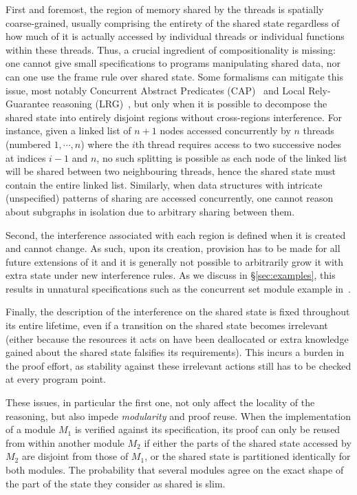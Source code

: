 First and foremost, the region of memory shared by the threads is
spatially coarse-grained, usually comprising the entirety of the
shared state regardless of how much of it is actually accessed by
individual threads or individual functions within these threads. Thus,
a crucial ingredient of compositionality is missing: one cannot give
small specifications to programs manipulating shared data, nor can one
use the frame rule over shared state. Some formalisms can mitigate
this issue, most notably Concurrent Abstract Predicates
(CAP)~\cite{cap-ecoop10} and Local Rely-Guarantee reasoning
(LRG)~\cite{lrg}, but only when it is possible to decompose the shared
state into entirely disjoint regions without cross-regions
interference. For instance, given a linked list of $n+1$ nodes
accessed concurrently by $n$ threads (numbered $1, \cdots, n$) where
the $i$th thread requires access to two successive nodes at indices
$i-1$ and $n$, no such splitting is possible as each node of the
linked list will be shared between two neighbouring threads, hence the
shared state must contain the entire linked list. Similarly, when data
structures with intricate (unspecified) patterns of sharing are
accessed concurrently, one cannot reason about subgraphs in isolation
due to arbitrary sharing between them.

Second, the interference associated with each region is defined when it is created and cannot change. As such, upon its creation, provision has to be made for
all future extensions of it and it is generally not possible to
arbitrarily grow it with extra state under new interference rules.
As we discuss in \S\ref{sec:examples}, this results in unnatural specifications such as the concurrent set module example in~\cite{cap-ecoop10}. 

Finally, the description of the interference on the shared state is
fixed throughout its entire lifetime, even if a transition on the shared state 
becomes irrelevant (either because the resources it acts on have been
deallocated or extra knowledge gained about the shared state
falsifies its requirements). This incurs
a burden in the proof effort, as stability against these irrelevant
actions still has to be checked at every program point.

These issues, in particular the first one, not only affect the
locality of the reasoning, but also impede \emph{modularity} and proof
reuse. When the implementation of a module $M_1$ is verified against
its specification, its proof can only be reused from within another
module $M_2$ if either the parts of the shared state accessed by $M_2$
are disjoint from those of $M_1$, or the shared state is partitioned
identically for both modules. The probability that several modules
agree on the exact shape of the part of the state they consider as
shared is slim.

